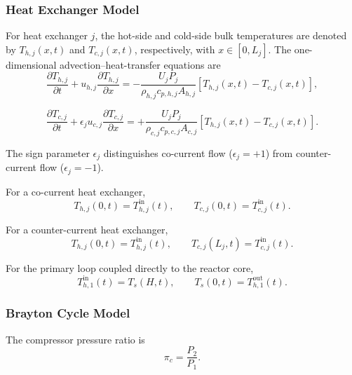 \documentclass[a4paper,12pt]{article}
\begin{document}
\subsubsection{Heat Exchanger Model}

For heat exchanger $j$, the hot-side and cold-side bulk temperatures are
denoted by $T_{h,j}(x,t)$ and $T_{c,j}(x,t)$, respectively, with
$x\in[0,L_j]$. The one-dimensional advection--heat-transfer equations are
\begin{equation}
\frac{\partial T_{h,j}}{\partial t}
+
u_{h,j}
\frac{\partial T_{h,j}}{\partial x}
=
-
\frac{
U_jP_j
}{
\rho_{h,j}c_{p,h,j}A_{h,j}
}
\left[
T_{h,j}(x,t)-T_{c,j}(x,t)
\right],
\label{eq:hx_hot}
\end{equation}

\begin{equation}
\frac{\partial T_{c,j}}{\partial t}
+
\epsilon_j u_{c,j}
\frac{\partial T_{c,j}}{\partial x}
=
+
\frac{
U_jP_j
}{
\rho_{c,j}c_{p,c,j}A_{c,j}
}
\left[
T_{h,j}(x,t)-T_{c,j}(x,t)
\right].
\label{eq:hx_cold}
\end{equation}

The sign parameter $\epsilon_j$ distinguishes co-current flow
($\epsilon_j=+1$) from counter-current flow ($\epsilon_j=-1$).

For a co-current heat exchanger,
\begin{equation}
T_{h,j}(0,t)=T_{h,j}^{\mathrm{in}}(t),
\qquad
T_{c,j}(0,t)=T_{c,j}^{\mathrm{in}}(t).
\label{eq:hx_cocurrent_bc}
\end{equation}

For a counter-current heat exchanger,
\begin{equation}
T_{h,j}(0,t)=T_{h,j}^{\mathrm{in}}(t),
\qquad
T_{c,j}(L_j,t)=T_{c,j}^{\mathrm{in}}(t).
\label{eq:hx_countercurrent_bc}
\end{equation}

For the primary loop coupled directly to the reactor core,
\begin{equation}
T_{h,1}^{\mathrm{in}}(t)=T_s(H,t),
\qquad
T_s(0,t)=T_{h,1}^{\mathrm{out}}(t).
\label{eq:core_hx_coupling}
\end{equation}

\subsubsection{Brayton Cycle Model}

The compressor pressure ratio is
\begin{equation}
\pi_c=\frac{P_2}{P_1}.
\label{eq:compressor_pressure_ratio}
\end{equation}
\end{document}
